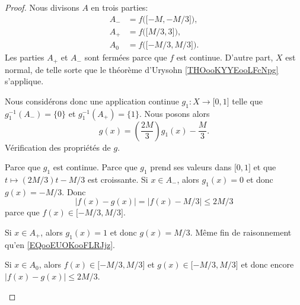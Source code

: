\begin{proof}
    Nous divisons \( A\) en trois parties:
    \begin{subequations}
        \begin{align}
            A_-&=f\big( \mathopen[ -M , -M/3 \mathclose] \big),\\
            A_+&=f\big( \mathopen[ M/3 , 3 \mathclose] \big),\\
            A_0&=f\big( \mathopen[ -M/3 , M/3 \mathclose] \big).
        \end{align}
    \end{subequations}
    Les parties \( A_+\) et \( A_-\) sont fermées parce que \( f\) est continue. D'autre part, \( X\) est normal, de telle sorte que le théorème d'Urysohn \ref{THOooKYYEooLFcNpg} s'applique.

    Nous considérons donc une application continue \( g_1\colon X\to \mathopen[ 0 , 1 \mathclose]\) telle que \( g_1^{-1}(A_-)=\{ 0 \}\) et \( g_1^{-1}(A_+)=\{ 1 \}\). Nous posons alors
    \begin{equation}
        g(x)=\left( \frac{ 2M }{ 3 } \right)g_1(x)-\frac{ M }{ 3 }.
    \end{equation}
    Vérification des propriétés de \( g\).
    \begin{subproof}
        Parce que \( g_1\) est continue.
    Parce que \( g_1\) prend ses valeurs dans \( \mathopen[ 0 , 1 \mathclose]\) et que \( t\mapsto (2M/3)t-M/3\) est croissante.
    \spitem[\( | f(x)-g(x) |\) sur \( A\)]
    Si \( x\in A_-\), alors \( g_1(x)=0\) et donc \( g(x)=-M/3\). Donc
    \begin{equation}        \label{EQooEUOKooFLRJjz}
        | f(x)-g(x) |=| f(x)-M/3 |\leq 2M/3
    \end{equation}
    parce que \( f(x)\in \mathopen[ -M/3 , M/3 \mathclose]\).

    Si \( x\in A_+\), alors \( g_1(x)=1\) et donc \( g(x)=M/3\). Même fin de raisonnement qu'en \eqref{EQooEUOKooFLRJjz}.

    Si \( x\in A_0\), alors \( f(x)\in \mathopen[ -M/3 , M/3 \mathclose]\) et \( g(x)\in\mathopen[ -M/3 , M/3 \mathclose]\) et donc encore \( | f(x)-g(x) |\leq 2M/3\).
    \end{subproof}
\end{proof}

